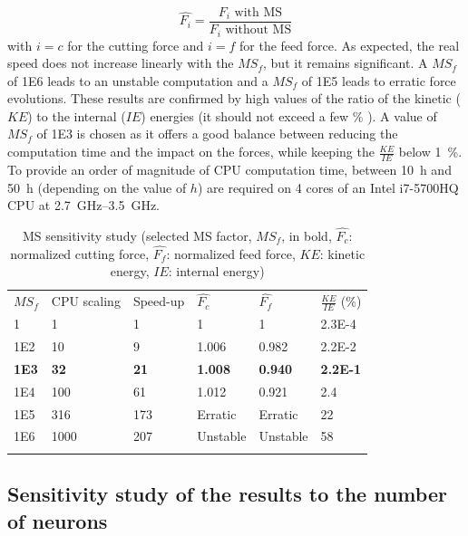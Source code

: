 \documentclass[preprint,12pt,times]{elsarticle}
\begin{document}
\begin{equation}
\hat{F_i} = \frac{F_i\text{ with MS}}{F_i\text{ without MS}}
\end{equation}
%
with $i = c$ for the cutting force and $i = f$ for the feed force. As expected, the real speed does not increase linearly with the ${MS}_f$, but it remains significant. A ${MS}_f$ of \num{1E6} leads to an unstable computation and a ${MS}_f$ of \num{1E5} leads to erratic force evolutions. These results are confirmed by high values of the ratio of the kinetic ($KE$) to the internal ($IE$) energies (it should not exceed a few \unit{\%} \cite{wang_Investigation_2011, ducobu_Introduction_2015}). A value of ${MS}_f$ of 1E3 is chosen as it offers a good balance between reducing the computation time and the impact on the forces, while keeping the $\frac{KE}{IE}$ below \qty{1}{\%}. To provide an order of magnitude of CPU computation time, between \qty{10}{\hour} and \qty{50}{\hour} (depending on the value of $h$) are required on 4 cores of an Intel i7-5700HQ CPU at \qtyrange{2.7}{3.5}{\GHz}.
%
\begin{table}[!h]
\begin{center}
\caption{\label{tab:MS} MS sensitivity study (selected MS factor, $MS_f$, in bold, $\hat{F_c}$: normalized cutting force, $\hat{F_f}$: normalized feed force, $KE$: kinetic energy, $IE$: internal energy)}
\begin{tabular}{llllll}
\hline\noalign{\smallskip}
$MS_f$ & CPU scaling & Speed-up & $\hat{F_c}$ & $\hat{F_f}$ & $\frac{KE}{IE}$ (\unit{\%})\\
\noalign{\smallskip}\hline\noalign{\smallskip}
1 & 1 & 1 & 1 & 1 & \num{2.3E-4}\\
\num{1E2} & 10 & 9 & 1.006 & 0.982 & \num{2.2E-2}\\
\textbf{\num{1E3}} & \textbf{32} & \textbf{21} & \textbf{1.008} & \textbf{0.940} & \textbf{\num{2.2E-1}}\\
\num{1E4} & 100 & 61 & 1.012 & 0.921 & 2.4\\
\num{1E5} & 316 & 173 & Erratic & Erratic & 22\\
\num{1E6} & 1000 & 207 & Unstable & Unstable & 58\\
\noalign{\smallskip}\hline
\end{tabular}
\end{center}
\end{table}
%

\subsection{Sensitivity study of the results to the number of neurons}
\label{subsec:nberneu}
\end{document}
